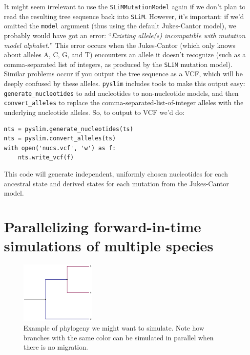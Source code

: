 \documentclass[12pt]{article}
\newcommand{\slim}[0]{\texttt{SLiM}\xspace}
\newcommand{\pyslim}[0]{\texttt{pyslim}\xspace}
\begin{document}
It might seem irrelevant to use the \verb|SLiMMutationModel| again
if we don't plan to read the resulting tree sequence back into \slim.
However, it's important: if we'd omitted the \verb|model| argument
(thus using the default Jukes-Cantor model),
we probably would have got an error:
``\textit{Existing allele(s) incompatible with mutation model alphabet.}''
This error occurs when the Jukes-Cantor (which only knows about alleles A, C, G, and T)
encounters an allele it doesn't recognize
(such as a comma-separated list of integers, as produced by the \slim mutation model).
Similar problems occur if you output the tree sequence as a VCF,
which will be deeply confused by these alleles.
\pyslim includes tools to make this output easy:
\verb|generate_nucleotides| to add nucleotides to non-nucleotide models,
and then \verb|convert_alleles| to replace the comma-separated-list-of-integer alleles
with the underlying nucleotide alleles.
So, to output to VCF we'd do:
\begin{listing}[H]
    \begin{verbatim}
nts = pyslim.generate_nucleotides(ts)
nts = pyslim.convert_alleles(ts)
with open('nucs.vcf', 'w') as f:
    nts.write_vcf(f)
    \end{verbatim}
\end{listing}
This code will generate independent, uniformly chosen nucleotides
for each ancestral state and derived states for each mutation
from the Jukes-Cantor model.


\section*{Parallelizing forward-in-time simulations of multiple species}

\begin{figure}[h!]
    \centering
     \includegraphics[width=0.33\textwidth]{./code/parallelizing_phylogeny/phylo.pdf}
     \caption{Example of phylogeny we might want to simulate. Note how branches with the same color can be simulated in parallel when there is no migration.}
     \label{fig:phylo}
    \end{figure}
\end{document}

